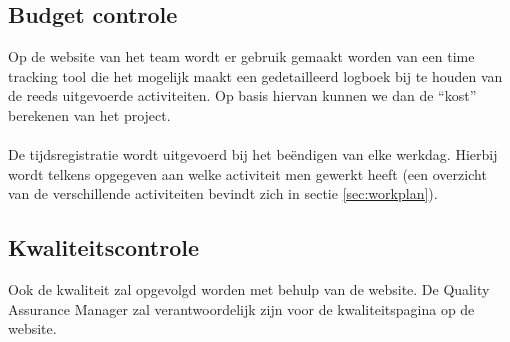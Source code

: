 \subsection{Budget controle}
Op de website van het team \cite{portalWebsite} wordt er gebruik gemaakt worden van een time tracking tool die het mogelijk maakt een gedetailleerd logboek bij te houden van de reeds uitgevoerde activiteiten. Op basis hiervan kunnen we dan de ``kost'' berekenen van het project. 
\\
\\
De tijdsregistratie wordt uitgevoerd bij het be\"{e}ndigen van elke werkdag. Hierbij wordt telkens opgegeven aan welke activiteit men gewerkt heeft (een overzicht van de verschillende activiteiten bevindt zich in sectie \ref{sec:workplan}).

\subsection{Kwaliteitscontrole}
Ook de kwaliteit zal opgevolgd worden met behulp van de website. De Quality Assurance Manager zal verantwoordelijk zijn voor de kwaliteitspagina op de website.


